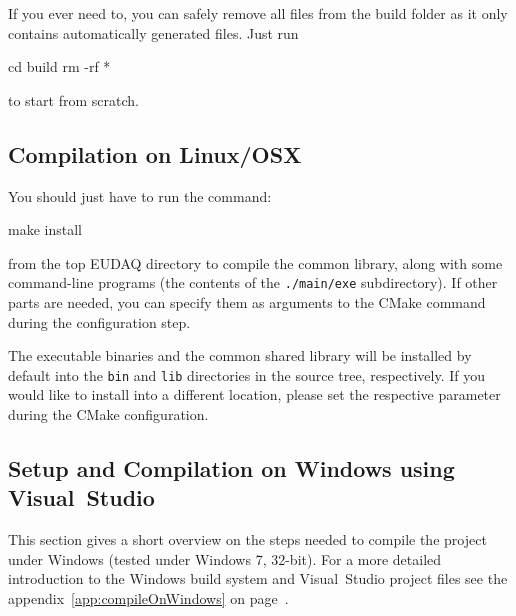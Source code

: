 If you ever need to, you can safely remove all files from the build folder
as it only contains automatically generated files. Just run
\begin{listing}[mybash]
cd build
rm -rf *
\end{listing}
to start from scratch.


\subsection{Compilation on Linux/OSX}
You should just have to run the command:
\begin{listing}[mybash]
make install
\end{listing}

from the top EUDAQ directory to compile the common library,
along with some command-line programs (the contents of the \texttt{./main/exe} subdirectory).
If other parts are needed, you can specify them as arguments to the
CMake command during the configuration step.

The executable binaries and the common shared library will be installed by default into the
\texttt{bin} and \texttt{lib} directories in the source tree,
respectively. If you would like to install into a different location,
please set the respective parameter during the CMake configuration.

\subsection{Setup and Compilation on Windows using Visual~Studio}

This section gives a short overview on the steps needed to compile the
project under Windows (tested under Windows 7, 32-bit). For a more
detailed introduction to the Windows build system and Visual~Studio
project files see the appendix~\ref{app:compileOnWindows} on
page~\pageref{app:compileOnWindows}.

